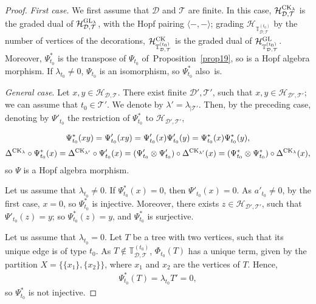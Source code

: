 \documentclass[pdftex]{sigma}
\numberwithin{equation}{section}
\newcommand{\T}{\mathcal{T}}
\newcommand{\D}{\mathcal{D}}
\newcommand{\h}{\mathcal{H}}
\newcommand{\bfT}{\mathbb{T}}
\begin{document}
\begin{proof}
\textit{First case.} We first assume that $\D$ and $\T$ are finite. In this case, $\h_{\D,\T}^{{\rm CK}_\lambda}$
is the graded dual of $\h_{\D,\T}^{{\rm GL}_\lambda}$,
with the Hopf pairing $\langle-,-\rangle$; grading $\h_{\bfT_{\D,\T}^{(t_0)}}$ by the number of vertices of the decorations,
$\h_{\bfT_{\D,\T}^{(t_0)}}^{{\rm CK}}$ is the graded dual of $\h_{\bfT_{\D,\T}^{(t_0)}}^{{\rm GL}}$.
Moreover, $\Psi_{t_0}^*$ is the transpose of $\Psi_{t_0}$ of~Proposition~\ref{prop19}, so is a Hopf algebra morphism.
If $\lambda_{t_0}\neq 0$, $\Psi_{t_0}$ is an isomorphism, so $\Psi_{t_0}^*$ also~is.

\textit{General case}. Let $x,y\in \h_{\D,\T}$. There exist finite $\D',\T'$, such that $x,y\in \h_{\D',\T'}$; we can assume that $t_0\in \T'$.
We denote by $\lambda'=\lambda_{\mid \T'}$.
Then, by the preceding case, denoting by $\Psi'_{t_0}$ the restriction of $\Psi^*_{t_0}$
to $\h_{\D',\T'}$,
{\samepage\begin{gather*}
\Psi^*_{t_0}(xy)=\Psi'_{t_0}(xy)=\Psi'_{t_0}(x)\Psi'_{t_0}(y)=\Psi^*_{t_0}(x)\Psi^*_{t_0}(y),
\\[.5ex]
\Delta^{{\rm CK}_\lambda}\circ \Psi^*_{t_0}(x)=\Delta^{{\rm CK}_{\lambda'}}
\circ \Psi'_{t_0}(x)=(\Psi'_{t_0}\otimes \Psi'_{t_0})\circ \Delta^{{\rm CK}_{\lambda'}}(x)
=(\Psi^*_{t_0}\otimes \Psi^*_{t_0})\circ \Delta^{{\rm CK}_\lambda}(x),
\end{gather*}
so $\Psi$ is a Hopf algebra morphism.

}

Let us assume that $\lambda_{t_0}\neq 0$. If $\Psi^*_{t_0}(x)=0$, then $\Psi'_{t_0}(x)=0$. As $a'_{t_0}\neq 0$, by the first case,
$x=0$, so $\Psi^*_{t_0}$ is injective. Moreover, there exists $z\in \h_{\D',\T'}$, such that $\Psi'_{t_0}(z)=y$;
so $\Psi^*_{t_0}(z)=y$, and $\Psi^*_{t_0}$ is surjective.

Let us assume that $\lambda_{t_0}=0$. Let $T$ be a tree with two vertices, such that its unique edge is of type $t_0$.
As $T \notin \bfT_{\D,\T}^{(t_0)}$, $\Phi_{t_0}(T)$ has a unique term, given by the partition $X=\{\{x_1\},\{x_2\}\}$,
where $x_1$ and $x_2$ are the vertices of $T$.
Hence,
\begin{gather*}\Psi^*_{t_0}(T)=\lambda_{t_0}T'=0,\end{gather*}
so $\Psi^*_{t_0}$ is not injective. \end{proof}
\end{document}
